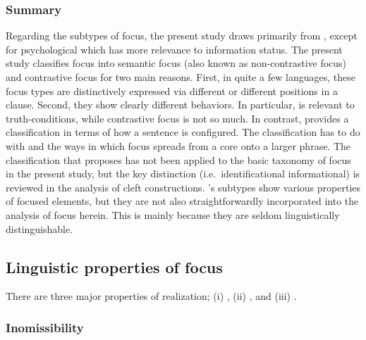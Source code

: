 \subsubsection{Summary}
\label{3:sssec:focus-sub-sum}

Regarding the subtypes of focus, the present study draws primarily
from \citet{gundel:99}, except for psychological  which has
more relevance to information status.  The present study classifies
focus into semantic focus (also known as non-contrastive
focus) and contrastive focus for two main
reasons.  First, in quite a few languages, these focus types are
distinctively expressed via different  or
different positions in a clause. Second, they show clearly different
behaviors. In particular,  is
relevant to truth-conditions, while contrastive focus is not so much. In contrast, \citet{lambrecht:96} provides a
classification in terms of how a sentence is configured. The
classification has to do with  and the ways in
which focus spreads from a core onto a larger phrase. The
classification that \citet{kiss:98} proposes has not been applied to
the basic taxonomy of focus in the present study, but the key
distinction (i.e.\ identificational \vs informational) is reviewed in
the analysis of cleft constructions.
\citeauthor{gussenhoven:07}'s subtypes show various properties of focused
elements, but they are not also straightforwardly incorporated into
the analysis of focus herein. This is mainly because they are seldom
linguistically distinguishable.


\subsection{Linguistic properties of focus}
\label{3:ssec:properties-focus}

There are three major properties of  realization; (i)
, (ii) , and (iii)
.

\subsubsection{Inomissibility}
\label{3:sssec:inomissibility}




